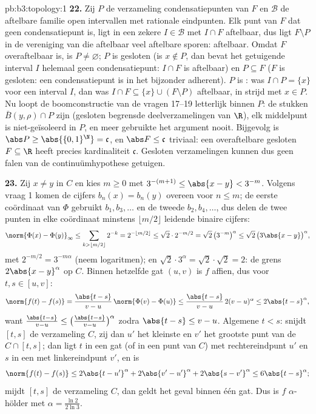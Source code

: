 \begin{solution}{pb:b3:topology:1}
\textbf{22.} Zij $P$ de verzameling condensatiepunten van $F$ en
$\mathcal B$ de aftelbare familie open intervallen met rationale
eindpunten. Elk punt van $F$ dat geen condensatiepunt is, ligt in
een zekere $I \in \mathcal B$ met $I \cap F$ aftelbaar, dus ligt
$F \setminus P$ in de vereniging van die aftelbaar veel aftelbare
sporen: aftelbaar. Omdat $F$ overaftelbaar is, is $P \neq
\varnothing$; $P$ is gesloten (is $x \notin P$, dan bevat het
getuigende interval $I$ helemaal geen condensatiepunt: $I \cap F$
is aftelbaar) en $P \subseteq F$ ($F$ is gesloten: een
condensatiepunt is in het bijzonder adherent). $P$ is : was
$I \cap P = \{x\}$ voor een interval $I$, dan was $I \cap F
\subseteq \{x\} \cup (F \setminus P)$ aftelbaar, in strijd met $x
\in P$. Nu loopt de boomconstructie van de vragen 17--19
letterlijk binnen $P$: de stukken $\bar B(y, \rho) \cap P$ zijn
 (gesloten begrensde deelverzamelingen van $\R$), elk
middelpunt is niet-geïsoleerd in $P$, en meer gebruikte het
argument nooit. Bijgevolg is $\abs P \geq \abs{\{0,1\}^\N} =
\mathfrak c$, en $\abs F \leq \mathfrak c$ triviaal: een
overaftelbare gesloten $F \subseteq \R$ heeft precies
kardinaliteit $\mathfrak c$. Gesloten verzamelingen kunnen dus
geen falen van de continuümhypothese getuigen.

\textbf{23.} Zij $x \neq y$ in $C$ en kies $m \geq 0$ met
$3^{-(m+1)} \leq \abs{x - y} < 3^{-m}$. Volgens vraag 1 komen de
cijfers $b_n(x) = b_n(y)$ overeen voor $n \leq m$; de eerste
coördinaat van $\Phi$ gebruikt $b_1, b_3, \dots$ en de tweede
$b_2, b_4, \dots$, dus delen de twee punten in elke coördinaat
minstens $\lfloor m/2\rfloor$ leidende binaire cijfers:
\[
\norm{\Phi(x) - \Phi(y)}_\infty
\leq \sum_{k > \lfloor m/2\rfloor}2^{-k}
= 2^{-\lfloor m/2\rfloor} \leq \sqrt2\cdot2^{-m/2}
= \sqrt2\,\bigl(3^{-m}\bigr)^\alpha
\leq \sqrt2\,\bigl(3\abs{x-y}\bigr)^\alpha,
\]
met $2^{-m/2} = 3^{-m\alpha}$ (neem logaritmen); en
$\sqrt2\cdot3^\alpha = \sqrt2\cdot\sqrt2 = 2$: de grens
$2\abs{x-y}^\alpha$ op $C$. Binnen hetzelfde gat $(u, v)$ is $f$
affien, dus voor $t, s \in [u, v]$:
\[
\norm{f(t) - f(s)} = \frac{\abs{t-s}}{v-u}\,
\norm{\Phi(v) - \Phi(u)}
\leq \frac{\abs{t-s}}{v-u}\,2(v-u)^\alpha
\leq 2\abs{t-s}^\alpha,
\]
want $\frac{\abs{t-s}}{v-u} \leq \bigl(\frac{\abs{t-s}}
{v-u}\bigr)^\alpha$ zodra $\abs{t-s} \leq v - u$. Algemene $t <
s$: snijdt $[t, s]$ de verzameling $C$, zij dan $u'$ het kleinste
en $v'$ het grootste punt van de  $C \cap [t, s]$; dan
ligt $t$ in een gat (of in een punt van $C$) met rechtereindpunt
$u'$ en $s$ in een met linkereindpunt $v'$, en is
\[
\norm{f(t) - f(s)} \leq 2\abs{t - u'}^\alpha
+ 2\abs{v' - u'}^\alpha + 2\abs{s - v'}^\alpha
\leq 6\abs{t - s}^\alpha ;
\]
mijdt $[t, s]$ de verzameling $C$, dan geldt het geval binnen één
gat. Dus is $f$ $\alpha$-hölder met $\alpha =
\frac{\ln2}{2\ln3}$.


\end{solution}
